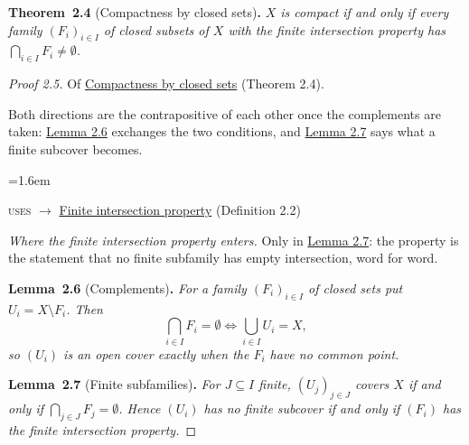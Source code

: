 \documentclass[11pt]{article}
\newenvironment{bpstatement}[2]{\par\addvspace{0.6\baselineskip}\noindent\textbf{#1}#2\textbf{.}\enspace\ignorespaces}
  {\par\addvspace{0.4\baselineskip}}
\newenvironment{bpstatementit}[2]{\begin{bpstatement}{#1}{#2}\itshape\ignorespaces}{\end{bpstatement}}
\newenvironment{bpstep}[1]{\par\addvspace{0.3\baselineskip}\begin{list}{}{\leftmargin=1.6em\rightmargin=0pt\topsep=0pt}\item\relax
  {\small\color{bpmuted}#1}\par\nopagebreak}{\end{list}\par}
\begin{document}
\label{bp10}%
\begin{bpstatementit}{Theorem~2.4}{ (Compactness by closed sets)}
\(X\) is compact if and only if every family \((F_i)_{i \in I}\) of closed subsets of \(X\) with the finite intersection property has \(\bigcap_{i \in I} F_i \neq \emptyset\).
\end{bpstatementit}
\label{bp11}%
\begin{proof}[{Proof 2.5}]
{\small\color{bpmuted}Of \hyperref[bp10]{Compactness by closed sets} (Theorem 2.4).}\par
Both directions are the contrapositive of each other once the complements are taken: \hyperref[bp12]{Lemma 2.6} exchanges the two conditions, and \hyperref[bp13]{Lemma 2.7} says what a finite subcover becomes.
\begin{bpstep}{\textsc{uses} \ensuremath{\to} \hyperref[bp6]{Finite intersection property} (Definition 2.2)}\label{bp21}%
\textit{Where the finite intersection property enters.}
Only in \hyperref[bp13]{Lemma 2.7}: the property is the statement that no finite subfamily has empty intersection, word for word.
\end{bpstep}
\label{bp12}%
\begin{bpstatementit}{Lemma~2.6}{ (Complements)}
For a family \((F_i)_{i \in I}\) of closed sets put \(U_i = X \setminus F_i\). Then \[
\bigcap_{i \in I} F_i = \emptyset
\iff
\bigcup_{i \in I} U_i = X ,
\] so \((U_i)\) is an open cover exactly when the \(F_i\) have no common point.
\end{bpstatementit}

\label{bp13}%
\begin{bpstatementit}{Lemma~2.7}{ (Finite subfamilies)}
For \(J \subseteq I\) finite, \((U_j)_{j \in J}\) covers \(X\) if and only if \(\bigcap_{j \in J} F_j = \emptyset\).  Hence \((U_i)\) has no finite subcover if and only if \((F_i)\) has the finite intersection property.
\end{bpstatementit}

\end{proof}
\end{document}
